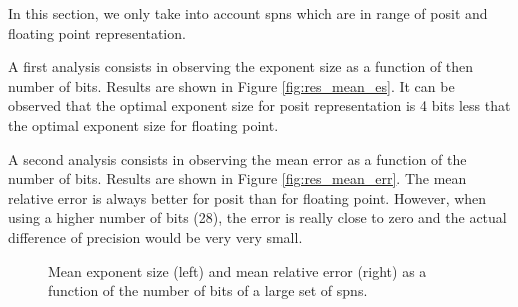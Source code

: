In this section, we only take into account \glspl{spn} which are in range of posit and floating point representation.

A first analysis consists in observing the exponent size as a function of then number of bits. Results are shown in Figure \ref{fig:res_mean_es}. It can be observed that the optimal exponent size for posit representation is 4 bits less that the optimal exponent size for floating point.

A second analysis consists in observing the mean error as a function of the number of bits. Results are shown in Figure \ref{fig:res_mean_err}. The mean relative error is always better for posit than for floating point. However, when using a higher number of bits (28), the error is really close to zero and the actual difference of precision would be very very small.




\begin{figure}[!ht]
\begin{mdframed}
\centering
{}
\caption{Mean exponent size (left) and mean relative error (right) as a function of the number of bits of a large set of \glspl{spn}.}
\label{fig:res_mean}
\end{mdframed}
\end{figure}

